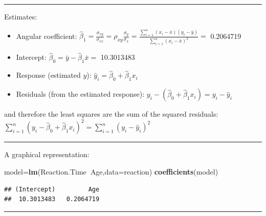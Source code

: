 \documentclass[]{article}
\newenvironment{Shaded}{\begin{snugshade}}{\end{snugshade}}
\newcommand{\DataTypeTok}[1]{\textcolor[rgb]{0.13,0.29,0.53}{#1}}
\newcommand{\DecValTok}[1]{\textcolor[rgb]{0.00,0.00,0.81}{#1}}
\newcommand{\KeywordTok}[1]{\textcolor[rgb]{0.13,0.29,0.53}{\textbf{#1}}}
\newcommand{\NormalTok}[1]{#1}
\newcommand{\OperatorTok}[1]{\textcolor[rgb]{0.81,0.36,0.00}{\textbf{#1}}}
\newcommand{\StringTok}[1]{\textcolor[rgb]{0.31,0.60,0.02}{#1}}
\providecommand{\tightlist}{%
  \setlength{\itemsep}{0pt}\setlength{\parskip}{0pt}}
\begin{document}
\begin{center}\rule{0.5\linewidth}{\linethickness}\end{center}

Estimates:

\begin{itemize}
\tightlist
\item
  Angular coefficient:
  \(\hat{\beta}_1=\frac{\sigma_{xy}}{\sigma_{xx}}=\rho_{xy}\frac{\sigma_{y}}{\sigma_{x}}=\frac{\sum_{i=1}^n(x_i- \bar{x})(y_i-\bar{y})}{\sum_{i=1}^n (x_i-\bar{x})^2}=\)
  0.2064719\\
\item
  Intercept: \(\hat{\beta}_0=\bar{y}-\hat{\beta}_1\bar{x}=\) 10.3013483
\item
  Response (estimated \(y\)):
  \(\hat{y}_i=\hat{\beta}_0 + \hat{\beta}_1x_i\)
\item
  Residuals (from the estimated response):
  \(y_i - (\hat{\beta}_0 + \hat{\beta}_1 x_i)=y_i- \hat{y}_i\)
\end{itemize}

and therefore the least squares are the sum of the squared residuals:
\(\sum_{i=1} ^ n (y_i- \hat{\beta}_0 + \hat{\beta}_1x_i) ^ 2=\sum_{i=1} ^ n (y_i- \hat{y}_i ) ^ 2\)

\begin{center}\rule{0.5\linewidth}{\linethickness}\end{center}

A graphical representation:

\begin{Shaded}
\begin{Highlighting}[]
\NormalTok{model=}\KeywordTok{lm}\NormalTok{(Reaction.Time}\OperatorTok{~}\NormalTok{Age,}\DataTypeTok{data=}\NormalTok{reaction)}
\KeywordTok{coefficients}\NormalTok{(model)}
\end{Highlighting}
\end{Shaded}

\begin{verbatim}
## (Intercept)         Age 
##  10.3013483   0.2064719
\end{verbatim}

\begin{center}\rule{0.5\linewidth}{\linethickness}\end{center}

\begin{Shaded}
\end{Shaded}
\end{document}
